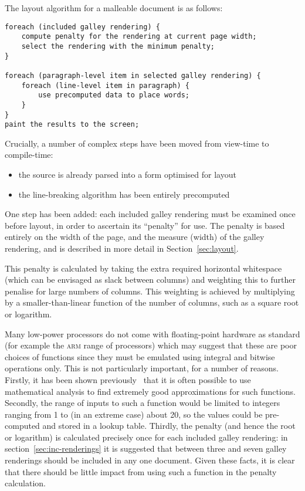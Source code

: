 The layout algorithm for a malleable document is as follows:

{\singlespacing
\begin{lstlisting}
foreach (included galley rendering) {
    compute penalty for the rendering at current page width;
    select the rendering with the minimum penalty;
}

foreach (paragraph-level item in selected galley rendering) {
    foreach (line-level item in paragraph) {
        use precomputed data to place words;
    }
}
paint the results to the screen;
\end{lstlisting}
}
Crucially, a number of complex steps have been moved from view-time to compile-time:
\begin{itemize}
 \item the source is already parsed into a form optimised for layout
 \item the line-breaking algorithm has been entirely precomputed
\end{itemize}
One step has been added: each included galley rendering must be examined once before layout, in order to ascertain its ``penalty'' for use. The penalty is based entirely on the width of the page, and the \gls{measure} (width) of the galley rendering, and is described in more detail in Section~\ref{sec:layout}.

This penalty is calculated by taking the extra required horizontal whitespace (which can be envisaged as slack between columns) and weighting this to further penalise for large numbers of columns. This weighting is achieved by multiplying by a smaller-than-linear function of the number of columns, such as a square root or logarithm.

Many low-power processors do not come with floating-point hardware as standard (for example the \textsc{arm} range of processors) which may suggest that these are poor choices of functions since they must be emulated using integral and bitwise operations only. This is not particularly important, for a number of reasons. Firstly, it has been shown previously~\cite{Lomont2003} that it is often possible to use mathematical analysis to find extremely good approximations for such functions. Secondly, the range of inputs to such a function would be limited to integers ranging from 1 to (in an extreme case) about 20, so the values could be pre-computed and stored in a lookup table. Thirdly, the penalty (and hence the root or logarithm) is calculated precisely once for each included galley rendering: in section~\ref{sec:inc-renderings} it is suggested that between three and seven galley renderings should be included in any one document. Given these facts, it is clear that there should be little impact from using such a function in the penalty calculation.

